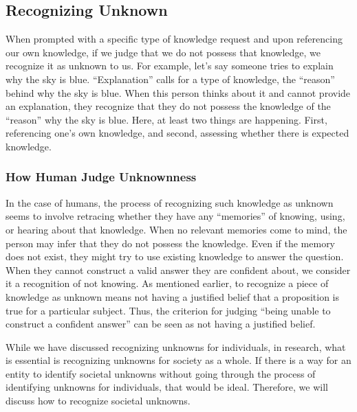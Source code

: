 \subsection{Recognizing Unknown}
When prompted with a specific type of knowledge request and upon referencing our own knowledge, if we judge that we do not possess that knowledge, we recognize it as unknown to us. For example, let's say someone tries to explain why the sky is blue. ``Explanation'' calls for a type of knowledge, the ``reason'' behind why the sky is blue. When this person thinks about it and cannot provide an explanation, they recognize that they do not possess the knowledge of the ``reason'' why the sky is blue. Here, at least two things are happening. First, referencing one's own knowledge, and second, assessing whether there is expected knowledge.

\subsubsection{How Human Judge Unknownness}
In the case of humans, the process of recognizing such knowledge as unknown seems to involve retracing whether they have any ``memories'' of knowing, using, or hearing about that knowledge. When no relevant memories come to mind, the person may infer that they do not possess the knowledge. Even if the memory does not exist, they might try to use existing knowledge to answer the question. When they cannot construct a valid answer they are confident about, we consider it a recognition of not knowing. As mentioned earlier, to recognize a piece of knowledge as unknown means not having a justified belief that a proposition is true for a particular subject. Thus, the criterion for judging ``being unable to construct a confident answer'' can be seen as not having a justified belief.

While we have discussed recognizing unknowns for individuals, in research, what is essential is recognizing unknowns for society as a whole. If there is a way for an entity to identify societal unknowns without going through the process of identifying unknowns for individuals, that would be ideal. Therefore, we will discuss how to recognize societal unknowns.

